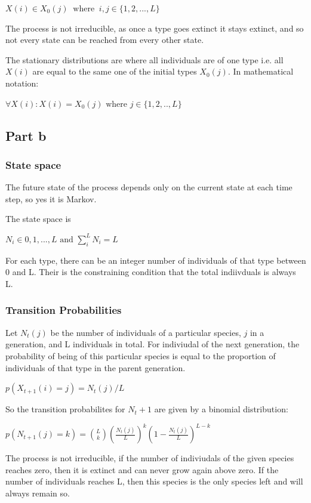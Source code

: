 \documentclass{article}
\begin{document}
$X(i) \in X_0(j) \ \text{ where } \ i,j \in \{1,2,...,L\}$ 


The process is not irreducible, as once a type goes extinct it stays extinct, and so not every state can be reached from every other state.

The stationary distributions are where all individuals are of one type i.e. all $X(i)$ are equal to the same one of the initial types $X_0(j)$. In mathematical notation:

$ \forall X(i) : X(i) = X_0(j) \text{ where } j \in \{1,2,..,L\}$  

\subsection{Part b}

\subsubsection{State space}

The future state of the process depends only on the current state at each time step, so yes it is Markov. 

The state space is 

$N_i \in {0,1,...,L} \text{ and } \sum\limits_i^LN_i = L$ 

For each type, there can be an integer number of individuals of that type between 0 and L. Their is the constraining condition that the total indiivduals is always L. 

\subsubsection{Transition Probabilities}

Let $N_t(j)$ be the number of individuals of a particular species, $j$ in a generation, and L individuals in total. For indiviudal of the next generation, the probability of being of this particular species is equal to the proportion of individuals of that type in the parent generation. 

$p(X_{t+1}(i) = j) = N_t(j)/L$

So the transition probabilites for $N_t+1$ are given by a binomial distribution:

$p(N_{t+1}(j) = k) = {L \choose k}(\frac{N_t(j)}{L})^k(1-\frac{N_t(j)}{L})^{L-k}$

The process is not irreducible, if the number of indiviudals of the given species reaches zero, then it is extinct and can never grow again above zero. If the number of individuals reaches L, then this species is the only species left and will always remain so. 
\end{document}
